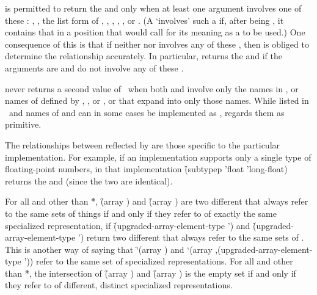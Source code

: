
 is permitted to return the 
  and  only when at least
one argument involves one of these :
  ,
  ,
  the list form of ,
  ,
  ,
  ,
  ,
or
  .
(A  `involves' such a  if, 
 after being ,
 it contains that  in a position that would call for
 its meaning as a  to be used.)
One consequence of this is that if neither  nor 
involves any of these , then  is obliged
to determine the relationship accurately.  In particular,  
returns the   and 
if the arguments are  and do not involve
any of these .

 never returns a second value of \nil\ when both
 and  involve only
 the names in \figref\StandardizedAtomicTypeSpecs, or
 names of  defined by ,
,
 or , or
  that expand into only those names.
While  listed in \figref\StandardizedAtomicTypeSpecs\ and 
names of  and  can in some cases be
implemented as ,  regards them as primitive.

The relationships between  reflected by 
are those specific to the particular implementation.  For example, if
an implementation supports only a single type of floating-point numbers,
in that implementation \f{(subtypep 'float 'long-float)} 
returns the   and  
(since the two  are identical).

For all  and  other than \f{*}, 
\f{(array )} and \f{(array )} 
are two different  that always refer to the same sets of
things if and only if they refer to 
of exactly the same specialized representation, \ie
if \f{(upgraded-array-element-type ')}  and
   \f{(upgraded-array-element-type ')} 
return two different  that always refer to the same sets of
.
This is another way of saying that 
\f{`(array )}
and
\f{`(array ,(upgraded-array-element-type '))} 
refer to the same
set of specialized  representations.
For all  and  other than \f{*}, 
the intersection of
    \f{(array )}
and \f{(array )} is the empty set
if and only if they refer to  of different,
distinct specialized representations.  

